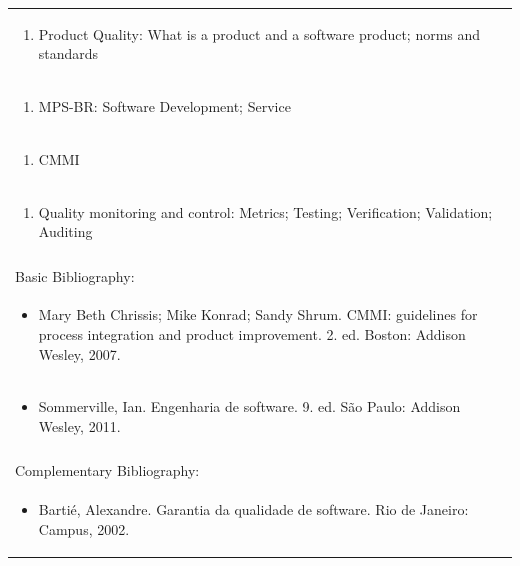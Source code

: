 \documentclass[11pt]{article}
\begin{document}
\begin{center}
\begin{longtable}{|p{4cm}|p{4cm}|p{4cm}|p{4cm}|}
\multicolumn{4}{|p{\dimexpr 16cm + 6\tabcolsep\relax}|}{\begin{enumerate}[start=3]\item Product Quality: What is a product and a software product; norms and standards\end{enumerate}}\\
\multicolumn{4}{|p{\dimexpr 16cm + 6\tabcolsep\relax}|}{\begin{enumerate}[start=4]\item MPS-BR: Software Development; Service\end{enumerate}}\\
\multicolumn{4}{|p{\dimexpr 16cm + 6\tabcolsep\relax}|}{\begin{enumerate}[start=5]\item CMMI\end{enumerate}}\\
\multicolumn{4}{|p{\dimexpr 16cm + 6\tabcolsep\relax}|}{\begin{enumerate}[start=6]\item Quality monitoring and control: Metrics; Testing; Verification; Validation; Auditing\end{enumerate}}\\
\multicolumn{4}{|p{\dimexpr 16cm + 6\tabcolsep\relax}|}{}\\
\hline
\multicolumn{4}{|p{16cm}|}{Basic Bibliography:}\\*
\multicolumn{4}{|p{\dimexpr 16cm + 6\tabcolsep\relax}|}{\begin{itemize}\item Mary Beth Chrissis; Mike Konrad; Sandy Shrum. CMMI: guidelines for process integration and product improvement. 2. ed. Boston: Addison Wesley, 2007.\end{itemize}}\\
\multicolumn{4}{|p{\dimexpr 16cm + 6\tabcolsep\relax}|}{\begin{itemize}\item Sommerville, Ian. Engenharia de software. 9. ed. São Paulo: Addison Wesley, 2011.\end{itemize}}\\
\multicolumn{4}{|p{16cm}|}{}\\
\hline
\multicolumn{4}{|p{16cm}|}{Complementary Bibliography:}\\*
\multicolumn{4}{|p{\dimexpr 16cm + 6\tabcolsep\relax}|}{\begin{itemize}\item Bartié, Alexandre. Garantia da qualidade de software. Rio de Janeiro: Campus, 2002.\end{itemize}}\\

\end{longtable}
\end{center}
\end{document}
